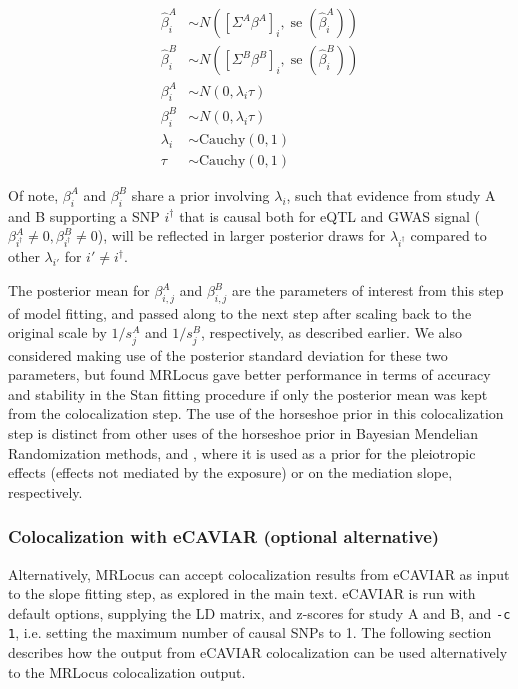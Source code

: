 \documentclass[11pt]{article}
\DeclareMathOperator{\se}{\textrm{se}}
\begin{document}
\begin{align}
  \widehat{\beta}^A_i &\sim N([\Sigma^A \beta^A]_i, \se(\widehat{\beta}^A_i)) \\
  \widehat{\beta}^B_i &\sim N([\Sigma^B \beta^B]_i, \se(\widehat{\beta}^B_i)) \\
  \beta_i^A &\sim N(0, \lambda_i \tau) \\
  \beta_i^B &\sim N(0, \lambda_i \tau) \\
  \lambda_i &\sim \textrm{Cauchy}(0,1) \\
  \tau &\sim \textrm{Cauchy}(0,1)
\end{align}

Of note, $\beta_i^A$ and $\beta_i^B$ share a prior involving
$\lambda_i$, such that evidence from study A and B supporting a
SNP $i^\dagger$ that is causal both for eQTL and GWAS signal
($\beta_{i^\dagger}^A \ne 0, \beta_{i^\dagger}^B \ne 0$),
will be reflected in larger posterior draws for $\lambda_{i^\dagger}$
compared to other $\lambda_{i'}$ for $i' \ne i^\dagger$.

The posterior mean for $\beta_{i,j}^A$ and $\beta_{i,j}^B$ are the
parameters of interest from this step of model fitting, and passed
along to the next step after scaling back to the original scale by
$1/s_j^A$ and $1/s_j^B$, respectively, as described earlier.
We also considered making use of the posterior standard deviation
for these two parameters, but found MRLocus gave better performance in
terms of accuracy and stability in the Stan fitting procedure if only
the posterior mean was kept from the colocalization step. 
The use of the horseshoe prior in this colocalization step
is distinct from other uses of the horseshoe prior in Bayesian
Mendelian Randomization methods, \citet{Berzuini2018} and
\citet{Uche2019}, where it is used as a prior for the
pleiotropic effects (effects not mediated by the exposure) or on the
mediation slope, respectively.

\subsubsection{Colocalization with eCAVIAR (optional alternative)}

Alternatively, MRLocus can accept colocalization results from eCAVIAR
as input to the slope fitting step, as explored in the main
text. eCAVIAR is run with default options, supplying the LD matrix,
and z-scores for study A and B, and \texttt{-c 1}, i.e. setting the
maximum number of causal SNPs to 1. The following section describes
how the output from eCAVIAR colocalization can be used alternatively
to the MRLocus colocalization output.
\end{document}
